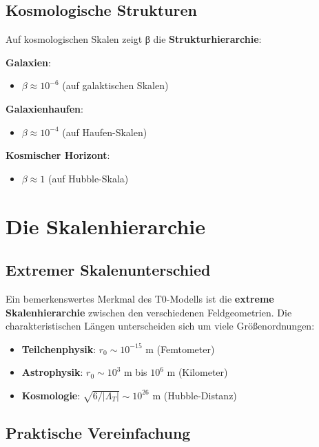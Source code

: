 \documentclass[12pt,a4paper]{report}
\begin{document}
	\subsection{Kosmologische Strukturen}
	
	Auf kosmologischen Skalen zeigt β die \textbf{Strukturhierarchie}:
	
	\textbf{Galaxien}:
	\begin{itemize}
		\item $\beta \approx 10^{-6}$ (auf galaktischen Skalen)
	\end{itemize}
	
	\textbf{Galaxienhaufen}:
	\begin{itemize}
		\item $\beta \approx 10^{-4}$ (auf Haufen-Skalen)
	\end{itemize}
	
	\textbf{Kosmischer Horizont}:
	\begin{itemize}
		\item $\beta \approx 1$ (auf Hubble-Skala)
	\end{itemize}
	
	\section{Die Skalenhierarchie}
	
	\subsection{Extremer Skalenunterschied}
	
	Ein bemerkenswertes Merkmal des T0-Modells ist die \textbf{extreme Skalenhierarchie} zwischen den verschiedenen Feldgeometrien. Die charakteristischen Längen unterscheiden sich um viele Größenordnungen:
	
	\begin{itemize}
		\item \textbf{Teilchenphysik}: $r_0 \sim 10^{-15}$ m (Femtometer)
		\item \textbf{Astrophysik}: $r_0 \sim 10^3$ m bis $10^6$ m (Kilometer)
		\item \textbf{Kosmologie}: $\sqrt{6/|\Lambda_T|} \sim 10^{26}$ m (Hubble-Distanz)
	\end{itemize}
	
	\subsection{Praktische Vereinfachung}
	
\end{document}
